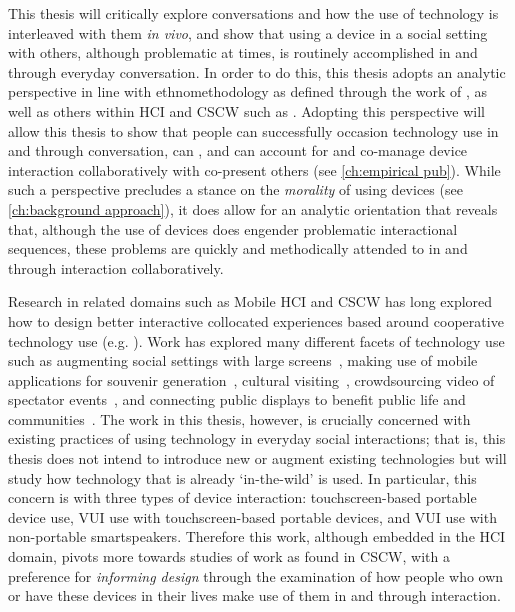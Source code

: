 This thesis will critically explore conversations and how the use of technology is interleaved with them \textit{in vivo}, and show that using a device in a social setting with others, although problematic at times, is routinely accomplished in and through everyday conversation.
In order to do this, this thesis adopts an analytic perspective in line with ethnomethodology as defined through the work of \citet{Garfinkel1967}, as well as others within \acf{HCI} and \acf{CSCW} such as \citet{Heath2010,Crabtree2012}.
Adopting this perspective will allow this thesis to show that people can successfully occasion technology use in and through conversation, can , and can account for and co-manage device interaction collaboratively with co-present others (see \autoref{ch:empirical pub}).
While such a perspective precludes a stance on the \textit{morality} of using devices (see \autoref{ch:background approach}), it does allow for an analytic orientation that reveals that, although the use of devices does engender problematic interactional sequences, these problems are quickly and methodically attended to in and through interaction collaboratively.

Research in related domains such as Mobile \ac{HCI} and \ac{CSCW} has long explored how to design better interactive collocated experiences based around cooperative technology use (e.g. \citet{Lundgren2015}).
Work has explored many different facets of technology use such as augmenting social settings with large screens~\citep{Lucero2012}, making use of mobile applications for souvenir generation~\citep{Durrant2011}, cultural visiting~\citep{Fosh2013}, crowdsourcing video of spectator events~\citep{Flintham2015}, and connecting public displays to benefit public life and communities~\citep{Memarovic2016}.
The work in this thesis, however, is crucially concerned with existing practices of using technology in everyday social interactions; that is, this thesis does not intend to introduce new or augment existing technologies but will study how technology that is already `in-the-wild' is used.
In particular, this concern is with three types of device interaction: touchscreen-based portable device use, \ac{VUI} use with touchscreen-based portable devices, and  \ac{VUI} use with non-port\-able smartspeakers.
Therefore this work, although embedded in the \ac{HCI} domain, pivots more towards studies of work as found in \ac{CSCW}, with a preference for \textit{informing design} through the examination of how people who own or have these devices in their lives make use of them in and through interaction.

